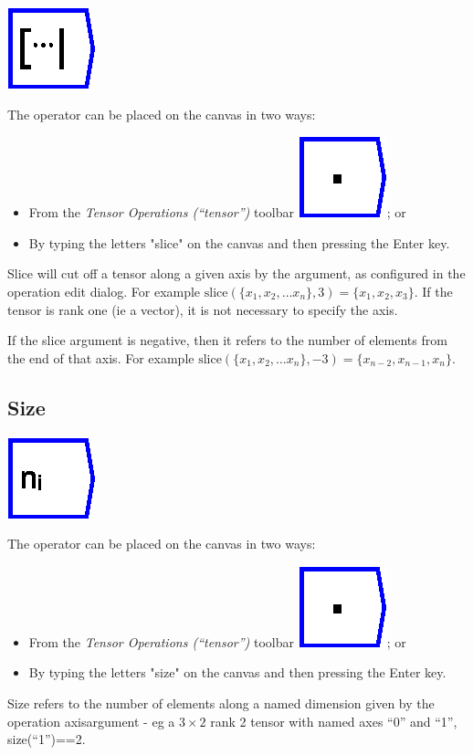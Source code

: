 \label{Operation:slice}

\includegraphics{images/slice}

The operator can be placed on the canvas in two ways:
\begin{itemize}
\item From the \emph{Tensor Operations (``tensor'')} toolbar \includegraphics{images/innerProduct};
or 
\item By typing the letters "slice" on the canvas and then pressing the
Enter key.
\end{itemize}
Slice will cut off a tensor along a given axis by the argument, as
configured in the operation edit dialog. For example $\mathrm{slice}(\{x_{1},x_{2},\ldots x_{n}\},3)=\{x_{1},x_{2},x_{3}\}$.
If the tensor is rank one (ie a vector), it is not necessary to specify
the axis.

If the slice argument is negative, then it refers to the number of
elements from the end of that axis. For example $\mathrm{slice}(\{x_{1},x_{2},\ldots x_{n}\},-3)=\{x_{n-2},x_{n-1},x_{n}\}$.

\subsection{Size}

\label{Operation:size}

\includegraphics{images/size}

The operator can be placed on the canvas in two ways:
\begin{itemize}
\item From the \emph{Tensor Operations (``tensor'')} toolbar \includegraphics{images/innerProduct};
or 
\item By typing the letters "size" on the canvas and then pressing the
Enter key.
\end{itemize}
Size refers to the number of elements along a named dimension given
by the operation axisargument - eg a $3\times2$ rank 2 tensor with
named axes ``0'' and ``1'', size(``1'')==2.

